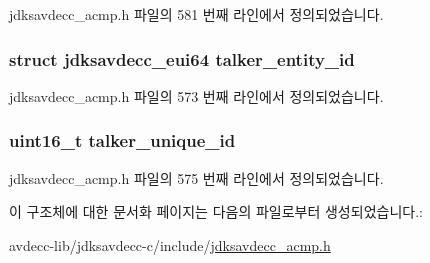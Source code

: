 jdksavdecc\+\_\+acmp.\+h 파일의 581 번째 라인에서 정의되었습니다.

\subsubsection[{\texorpdfstring{talker\+\_\+entity\+\_\+id}{talker_entity_id}}]{\setlength{\rightskip}{0pt plus 5cm}struct {\bf jdksavdecc\+\_\+eui64} talker\+\_\+entity\+\_\+id}\hypertarget{structjdksavdecc__acmpdu_a5a263561481c86cc310ff078f7313b6d}{}\label{structjdksavdecc__acmpdu_a5a263561481c86cc310ff078f7313b6d}


jdksavdecc\+\_\+acmp.\+h 파일의 573 번째 라인에서 정의되었습니다.

\subsubsection[{\texorpdfstring{talker\+\_\+unique\+\_\+id}{talker_unique_id}}]{\setlength{\rightskip}{0pt plus 5cm}uint16\+\_\+t talker\+\_\+unique\+\_\+id}\hypertarget{structjdksavdecc__acmpdu_a0358bf4a1f59922974d1f0cb08fd8ef4}{}\label{structjdksavdecc__acmpdu_a0358bf4a1f59922974d1f0cb08fd8ef4}


jdksavdecc\+\_\+acmp.\+h 파일의 575 번째 라인에서 정의되었습니다.



이 구조체에 대한 문서화 페이지는 다음의 파일로부터 생성되었습니다.\+:\begin{DoxyCompactItemize}
\item 
avdecc-\/lib/jdksavdecc-\/c/include/\hyperlink{jdksavdecc__acmp_8h}{jdksavdecc\+\_\+acmp.\+h}\end{DoxyCompactItemize}
